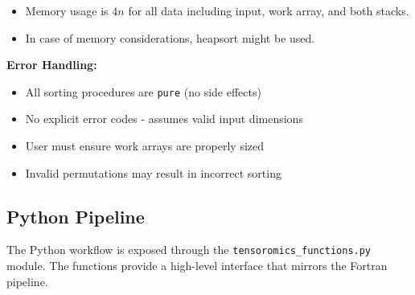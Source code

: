 \documentclass[11pt]{article}
\begin{document}
\begin{enumerate}
\begin{itemize}
	      	\item Memory usage is $4n$ for all data including input, work array, and
	      	      both stacks.
	      	      
	      	\item In case of memory considerations, heapsort might be used.
	      \end{itemize}
	      
	      \textbf{Error Handling:}
	      \begin{itemize}
	      	\item All sorting procedures are \texttt{pure} (no side effects)
	      	      
	      	\item No explicit error codes - assumes valid input dimensions
	      	      
	      	\item User must ensure work arrays are properly sized
	      	      
	      	\item Invalid permutations may result in incorrect sorting
	      \end{itemize}
\end{enumerate}

\subsection{Python Pipeline}
The Python workflow is exposed through the \texttt{tensoromics\_functions.py}
module. The functions provide a high-level interface that mirrors the Fortran pipeline.
\end{document}
